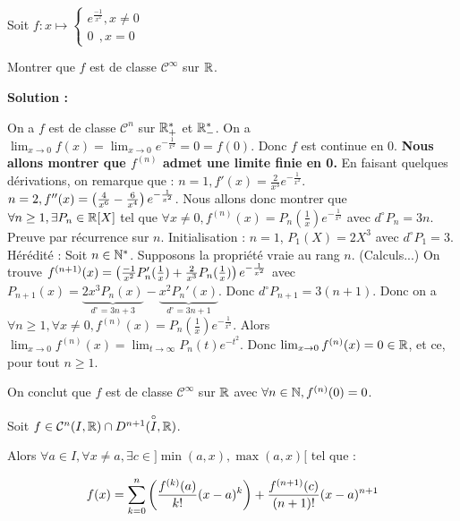 \documentclass[12pt, a4paper]{report}
\begin{document}
\begin{exercise}
    Soit $f:x\mapsto \begin{cases} e^{\frac{-1}{x^2}}, x\not=0\\0~~ , x=0\end{cases}$

    Montrer que $f$ est de classe $\mathcal{C}^\infty$ sur $\mathbb{R}$.

    \textbf{Solution :}

    \begin{outline}
        \1 On a $f$ est de classe $\mathcal{C}^n$ sur $\mathbb{R}_+^*$ et $\mathbb{R}_-^*$.
        \1 On a $\lim_{x\to 0}f(x)=\lim_{x\to 0}e^{-\frac1{x^2}}=0=f(0)$.
        \1 Donc $f$ est continue en $0$.
        \1 \textbf{Nous allons montrer que $f^{(n)}$ admet une limite finie en 0.}
        \2 En faisant quelques dérivations, on remarque que :
        \2 $n=1, f'(x)=\frac{2}{x^3}e^{-\frac{1}{x^2}}$.
        \2 $n=2, f''(x)=\left(\frac{4}{x^6}-\frac{6}{x^4}\right)e^{-\frac{1}{x^2}}$.
        \2 Nous allons donc montrer que $\forall n \ge 1, \exists P_n \in \mathbb{R}[X]$ tel que $\forall x \neq 0, f^{(n)}(x)=P_n(\frac{1}{x})e^{-\frac{1}{x^2}}$ avec $d^\circ P_n = 3n$.
        \3 Preuve par récurrence sur $n$.
        \3 Initialisation : $n=1$, $P_1(X)=2X^3$ avec $d^\circ P_1=3$.
        \3 Hérédité : Soit $n\in\mathbb{N}^*$. Supposons la propriété vraie au rang $n$.
        \3 (Calculs...)
        \3 On trouve $f^{(n+1)}(x)=\left(\frac{-1}{x^2}P_n'(\frac1x)+\frac{2}{x^3}P_n(\frac1x)\right)e^{-\frac{1}{x^2}}$ avec $P_{n+1}(x)=\underbrace{2x^3P_n(x)}_{d^\circ = 3n+3}-\underbrace{x^2P_n'(x)}_{d^\circ=3n+1}$.
        \3 Donc $d^\circ P_{n+1}=3(n+1)$.
        \2 Donc on a $\forall n \ge 1, \forall x \neq 0, f^(n)(x)=P_n(\frac{1}{x})e^{-\frac{1}{x^2}}$.
        \2 Alors $\lim_{x\to0} f^{(n)}(x)=\lim_{t\to\infty}P_n(t)e^{-t^2}$.
        \1 Donc $\lim_{x\to0} f^{(n)}(x)=0 \in \mathbb{R}$, et ce, pour tout $n\ge 1$.
    \end{outline}

    On conclut que $f$ est de classe $\mathcal{C}^\infty$ sur $\mathbb{R}$ avec $\forall n \in \mathbb{N}, f^{(n)}(0)=0$.
\end{exercise}

\begin{theorem}
    Soit $f \in \mathcal{C}^n(I,\mathbb{R}) \cap D^{n+1}(\overset{\circ}{I},\mathbb{R})$.

    Alors $\forall a \in I, \forall x \ne a, \exists c \in ]\min(a,x),\max(a,x)[$ tel que :

    $$f(x)=\sum_{k=0}^n\left(\frac{f^{(k)}(a)}{k!}(x-a)^k\right)+\frac{f^{(n+1)}(c)}{(n+1)!}(x-a)^{n+1}$$
\end{theorem}
\end{document}
